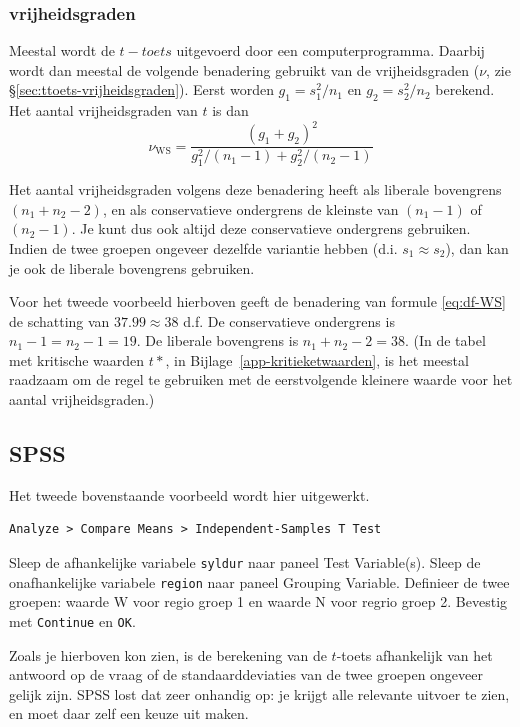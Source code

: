 \documentclass[
]{book}
\begin{document}
\subsubsection{vrijheidsgraden}\label{vrijheidsgraden}

Meestal wordt de \(t-toets\) uitgevoerd door een computerprogramma.
Daarbij wordt dan meestal de volgende benadering gebruikt van de
vrijheidsgraden (\(\nu\), zie §\ref{sec:ttoets-vrijheidsgraden}). Eerst
worden \(g_1=s^2_1/n_1\) en \(g_2=s^2_2/n_2\) berekend. Het aantal
vrijheidsgraden van \(t\) is dan
\begin{equation}
  \label{eq:df-WS}
  \nu_\textrm{WS} = 
        \frac {(g_1+g_2)^2} {g^2_1/(n_1-1) + g^2_2/(n_2-1)}
\end{equation}

Het aantal vrijheidsgraden volgens deze benadering heeft als liberale
bovengrens \((n_1+n_2-2)\), en als conservatieve ondergrens de kleinste
van \((n_1-1)\) of \((n_2-1)\). Je kunt dus ook altijd deze conservatieve
ondergrens gebruiken. Indien de twee groepen ongeveer dezelfde variantie
hebben (d.i. \(s_1 \approx s_2\)), dan kan je ook de liberale bovengrens
gebruiken.

Voor het tweede voorbeeld hierboven geeft de benadering van formule
\eqref{eq:df-WS} de schatting van \(37.99 \approx 38\) d.f. De
conservatieve ondergrens is \(n_1-1 = n_2-1 = 19\). De liberale bovengrens
is \(n_1+n_2 -2 = 38\). (In de tabel met kritische waarden \(t*\), in
Bijlage~\ref{app-kritieketwaarden}, is het meestal raadzaam om de regel
te gebruiken met de eerstvolgende kleinere waarde voor het aantal
vrijheidsgraden.)

\subsection{SPSS}\label{sec:SPSS-ttoets-ongepaard}

Het tweede bovenstaande voorbeeld wordt hier uitgewerkt.

\begin{verbatim}
Analyze > Compare Means > Independent-Samples T Test
\end{verbatim}

Sleep de afhankelijke variabele \texttt{syldur} naar paneel Test Variable(s).
Sleep de onafhankelijke variabele \texttt{region} naar paneel Grouping
Variable. Definieer de twee groepen: waarde W voor regio groep 1 en
waarde N voor regrio groep 2. Bevestig met \texttt{Continue} en \texttt{OK}.

Zoals je hierboven kon zien, is de berekening van de \(t\)-toets
afhankelijk van het antwoord op de vraag of de standaarddeviaties van de
twee groepen ongeveer gelijk zijn. SPSS lost dat zeer onhandig op: je
krijgt alle relevante uitvoer te zien, en moet daar zelf een keuze uit
maken.
\end{document}

